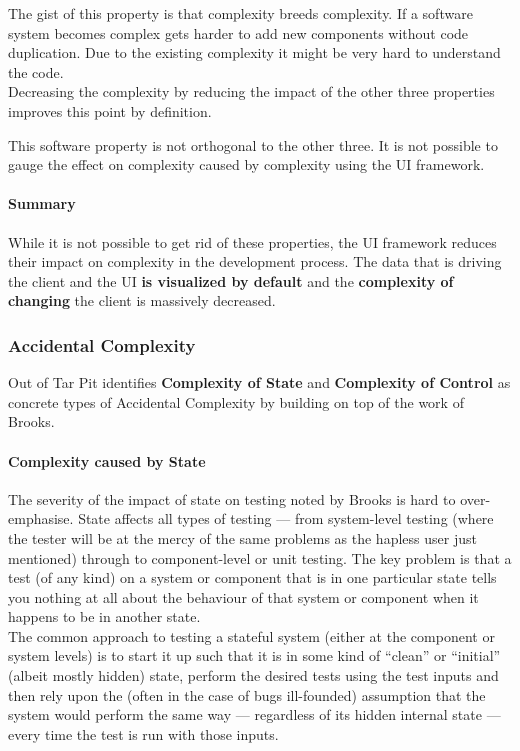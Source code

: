 The gist of this property is that complexity breeds complexity. If a software system becomes complex gets harder to add new components without code duplication. Due to the existing complexity it might be very hard to understand the code. \\ Decreasing the complexity by reducing the impact of the other three properties improves this point by definition.

This software property is not orthogonal to the other three. It is not possible to gauge the effect on complexity caused by complexity using the UI framework.

\paragraph{Summary}
While it is not possible to get rid of these properties, the UI framework reduces their impact on complexity in the development process. The data that is driving the client and the UI \textbf{is visualized by default} and the \textbf{complexity of changing} the client is massively decreased.

\subsubsection{Accidental Complexity}
Out of Tar Pit identifies \textbf{Complexity of State} and \textbf{Complexity of Control} as concrete types of Accidental Complexity by building on top of the work of Brooks.

\paragraph{Complexity caused by State}
The severity of the impact of state on testing noted by Brooks is hard to over-emphasise. State affects all types of testing — from system-level testing (where the tester will be at the mercy of the same problems as the hapless user just mentioned) through to component-level or unit testing. The key problem is that a test (of any kind) on a system or component that is in one particular state tells you nothing at all about the behaviour of that system or component when it happens to be in another state. \\
The common approach to testing a stateful system (either at the component or system levels) is to start it up such that it is in some kind of “clean” or “initial” (albeit mostly hidden) state, perform the desired tests using the test inputs and then rely upon the (often in the case of bugs ill-founded) assumption that the system would perform the same way — regardless of its hidden internal state — every time the test is run with those inputs. \citep{outoftarpit}

